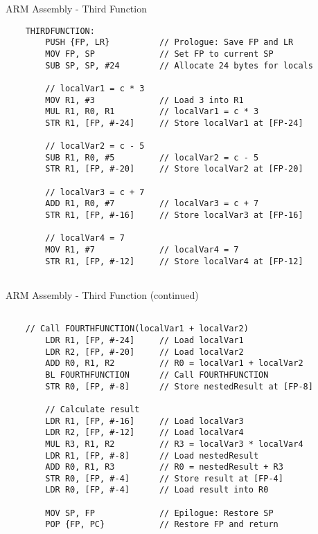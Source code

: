 \documentclass[aspectratio=169]{beamer}
\begin{document}
\begin{frame}[fragile]{ARM Assembly - Third Function}
    \begin{verbatim}
    THIRDFUNCTION:
        PUSH {FP, LR}          // Prologue: Save FP and LR
        MOV FP, SP             // Set FP to current SP
        SUB SP, SP, #24        // Allocate 24 bytes for locals
    
        // localVar1 = c * 3
        MOV R1, #3             // Load 3 into R1
        MUL R1, R0, R1         // localVar1 = c * 3
        STR R1, [FP, #-24]     // Store localVar1 at [FP-24]
    
        // localVar2 = c - 5
        SUB R1, R0, #5         // localVar2 = c - 5
        STR R1, [FP, #-20]     // Store localVar2 at [FP-20]
    
        // localVar3 = c + 7
        ADD R1, R0, #7         // localVar3 = c + 7
        STR R1, [FP, #-16]     // Store localVar3 at [FP-16]
    
        // localVar4 = 7
        MOV R1, #7             // localVar4 = 7
        STR R1, [FP, #-12]     // Store localVar4 at [FP-12]
    
\end{verbatim}
\end{frame}

\begin{frame}[fragile]{ARM Assembly - Third Function (continued)}
    \begin{verbatim}

    // Call FOURTHFUNCTION(localVar1 + localVar2)
        LDR R1, [FP, #-24]     // Load localVar1
        LDR R2, [FP, #-20]     // Load localVar2
        ADD R0, R1, R2         // R0 = localVar1 + localVar2
        BL FOURTHFUNCTION      // Call FOURTHFUNCTION
        STR R0, [FP, #-8]      // Store nestedResult at [FP-8]
    
        // Calculate result
        LDR R1, [FP, #-16]     // Load localVar3
        LDR R2, [FP, #-12]     // Load localVar4
        MUL R3, R1, R2         // R3 = localVar3 * localVar4
        LDR R1, [FP, #-8]      // Load nestedResult
        ADD R0, R1, R3         // R0 = nestedResult + R3
        STR R0, [FP, #-4]      // Store result at [FP-4]
        LDR R0, [FP, #-4]      // Load result into R0
    
        MOV SP, FP             // Epilogue: Restore SP
        POP {FP, PC}           // Restore FP and return
    \end{verbatim}
\end{frame}
\end{document}
